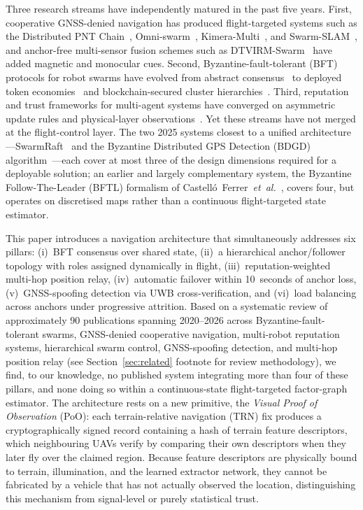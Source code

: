\documentclass[journal,10pt,twocolumn]{IEEEtran}
\begin{document}
Three research streams have independently matured in the past five years. First, cooperative GNSS-denied navigation has produced flight-targeted systems such as the Distributed PNT Chain~\cite{shapero2023distributed}, Omni-swarm~\cite{xu2022omniswarm}, Kimera-Multi~\cite{tian2022kimera}, and Swarm-SLAM~\cite{lajoie2024swarmslam}, and anchor-free multi-sensor fusion schemes such as DTVIRM-Swarm~\cite{dtvirm2026} have added magnetic and monocular cues. Second, Byzantine-fault-tolerant (BFT) protocols for robot swarms have evolved from abstract consensus~\cite{strobel2020blockchain} to deployed token economies~\cite{strobel2023robot} and blockchain-secured cluster hierarchies~\cite{alsamhi2023blockchain}. Third, reputation and trust frameworks for multi-agent systems have converged on asymmetric update rules and physical-layer observations~\cite{yemini2022characterizing,mallmanntrenn2022crowd,ballotta2025confidence}. Yet these streams have not merged at the flight-control layer. The two 2025 systems closest to a unified architecture---SwarmRaft~\cite{dev2025swarmraft} and the Byzantine Distributed GPS Detection (BDGD) algorithm~\cite{zhong2025bdgd}---each cover at most three of the design dimensions required for a deployable solution; an earlier and largely complementary system, the Byzantine Follow-The-Leader (BFTL) formalism of Castelló~Ferrer~\emph{et~al.}~\cite{castelloferrer2022bftl}, covers four, but operates on discretised maps rather than a continuous flight-targeted state estimator.

This paper introduces a navigation architecture that simultaneously addresses six pillars: (i)~BFT consensus over shared state, (ii)~a hierarchical anchor/follower topology with roles assigned dynamically in flight, (iii)~reputation-weighted multi-hop position relay, (iv)~automatic failover within 10~seconds of anchor loss, (v)~GNSS-spoofing detection via UWB cross-verification, and (vi)~load balancing across anchors under progressive attrition. Based on a systematic review of approximately 90 publications spanning 2020--2026 across Byzantine-fault-tolerant swarms, GNSS-denied cooperative navigation, multi-robot reputation systems, hierarchical swarm control, GNSS-spoofing detection, and multi-hop position relay (see Section~\ref{sec:related} footnote for review methodology), we find, to our knowledge, no published system integrating more than four of these pillars, and none doing so within a continuous-state flight-targeted factor-graph estimator. The architecture rests on a new primitive, the \emph{Visual Proof of Observation} (PoO): each terrain-relative navigation (TRN) fix produces a cryptographically signed record containing a hash of terrain feature descriptors, which neighbouring UAVs verify by comparing their own descriptors when they later fly over the claimed region. Because feature descriptors are physically bound to terrain, illumination, and the learned extractor network, they cannot be fabricated by a vehicle that has not actually observed the location, distinguishing this mechanism from signal-level or purely statistical trust.
\end{document}

